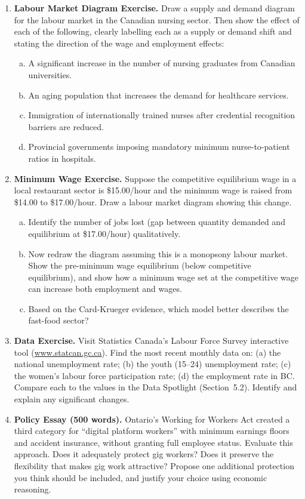 \begin{enumerate}

\item \textbf{Labour Market Diagram Exercise.} Draw a supply and demand diagram for the labour market in the Canadian nursing sector. Then show the effect of each of the following, clearly labelling each as a supply or demand shift and stating the direction of the wage and employment effects:
  \begin{enumerate}[(a)]
    \item A significant increase in the number of nursing graduates from Canadian universities.
    \item An aging population that increases the demand for healthcare services.
    \item Immigration of internationally trained nurses after credential recognition barriers are reduced.
    \item Provincial governments imposing mandatory minimum nurse-to-patient ratios in hospitals.
  \end{enumerate}

\item \textbf{Minimum Wage Exercise.} Suppose the competitive equilibrium wage in a local restaurant sector is \$15.00/hour and the minimum wage is raised from \$14.00 to \$17.00/hour. Draw a labour market diagram showing this change.
  \begin{enumerate}[(a)]
    \item Identify the number of jobs lost (gap between quantity demanded and equilibrium at \$17.00/hour) qualitatively.
    \item Now redraw the diagram assuming this is a monopsony labour market. Show the pre-minimum wage equilibrium (below competitive equilibrium), and show how a minimum wage set at the competitive wage can increase both employment and wages.
    \item Based on the Card-Krueger evidence, which model better describes the fast-food sector?
  \end{enumerate}

\item \textbf{Data Exercise.} Visit Statistics Canada's Labour Force Survey interactive tool (\url{www.statcan.gc.ca}). Find the most recent monthly data on: (a) the national unemployment rate; (b) the youth (15--24) unemployment rate; (c) the women's labour force participation rate; (d) the employment rate in BC. Compare each to the values in the Data Spotlight (Section~5.2). Identify and explain any significant changes.

\item \textbf{Policy Essay (500 words).} Ontario's Working for Workers Act created a third category for ``digital platform workers'' with minimum earnings floors and accident insurance, without granting full employee status. Evaluate this approach. Does it adequately protect gig workers? Does it preserve the flexibility that makes gig work attractive? Propose one additional protection you think should be included, and justify your choice using economic reasoning.

\end{enumerate}
